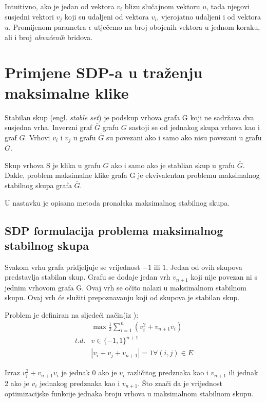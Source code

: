 \documentclass[diplomskirad]{fer}
\begin{document}
Intuitivno, ako je jedan od vektora $v_i$ blizu slučajnom vektoru $u$, tada njegovi susjedni vektori $v_j$ koji su udaljeni od vektora $v_i$, vjerojatno
udaljeni i od vektora $u$. Promijenom parametra $\epsilon$ utječemo na broj obojenih vektora u jednom koraku, ali i broj \textit{uhvaćenih} bridova.
  
\chapter{Primjene SDP-a u traženju maksimalne klike}
\label{pog:primjene_SDP-a_u_traženju_maksimalne_klike}

Stabilan skup (engl. \textit{stable set}) je podskup vrhova grafa G koji ne sadržava dva susjedna vrha. Inverzni graf $\bar{G}$ grafu $G$ 
sastoji se od jednakog skupa vrhova kao i graf $G$. Vrhovi $v_i$ i $v_j$ u grafu $\bar{G}$ su povezani ako i samo ako nisu povezani u grafu $G$.

Skup vrhova S je klika u grafu $G$ ako i samo ako je stablian skup u grafu $\bar{G}$. Dakle, problem maksimalne klike grafa G je ekvivalentan
problemu maksimalnog stabilnog skupa grafa $\bar{G}$. \cite{article}

U nastavku je opisana metoda pronalska maksimalnog stabilnog skupa.

\section{SDP formulacija problema maksimalnog stabilnog skupa}
Svakom vrhu grafa pridjeljuje se vrijednost $-1$ ili $1$. Jedan od ovih skupova predstavlja stabilan skup. Grafu se dodaje jedan vrh $v_{n+1}$ koji
nije povezan ni s jednim vrhovom grafa G. Ovaj vrh se očito nalazi u maksimalnom stabilnom skupu. Ovaj vrh će služiti prepoznavanju koji od skupova
je stabilan skup.

Problem je definiran na sljedeći način(iz \cite{article}):
\begin{equation}
  \begin{split}
    & \max \frac{1}{2} \sum_{i=1}^{n} (v_i^2+v_{n+1}v_{i}) \\
    t.d. & v \in \{-1, 1\}^{n+1} \\
         & |v_i+v_j+v_{n+1}| = 1 \forall (i, j) \in E
  \end{split}   
\end{equation}

Izraz $v_i^2+v_{n+1}v_{i}$ je jednak 0 ako je $v_i$ različitog predznaka kao i $v_{n+1}$ ili jednak 2 ako je $v_i$ jednakog predznaka kao i $v_{n+1}$.
Što znači da je vrijednost optimizacijske funkcije jednaka broju vrhova u maksimalnom stabilnom skupu.
\end{document}
